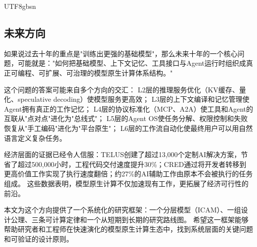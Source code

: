 \documentclass[11pt,a4paper]{article}
\begin{document}
\begin{CJK*}{UTF8}{gbsn}
\subsection{未来方向}

如果说过去十年的重点是"训练出更强的基础模型"，那么未来十年的一个核心问题，可能就是："如何把基础模型、上下文记忆、工具接口与Agent运行时组织成真正可编程、可扩展、可治理的模型原生计算体系结构。"

这个问题的答案可能来自多个方向的交汇：
L2层的推理服务优化（KV缓存、量化、speculative decoding）使模型服务更高效；
L3层的上下文编译和记忆管理使Agent拥有真正的工作记忆；
L4层的协议标准化（MCP、A2A）使工具和Agent的互联从"点对点"进化为"总线式"；
L5层的Agent OS使任务分解、权限控制和失败恢复从"手工编码"进化为"平台原生"；
L6层的工作流自动化使最终用户可以用自然语言定义复杂任务。

经济层面的证据已经令人信服：TELUS创建了超过13{,}000个定制AI解决方案，节省了超过500{,}000小时，工程代码交付速度提升30\%；CRED通过将开发者转移到更高价值工作实现了执行速度翻倍；约27\%的AI辅助工作由原本不会被执行的任务组成\cite{anthropic2026agenticreport}。
这些数据表明，模型原生计算不仅加速现有工作，更拓展了经济可行性的前沿。

本文为这个方向提供了一个系统化的研究框架：一个分层模型（ICAM）、一组设计公理、三条可计算定律和一个从短期到长期的研究路线图。
希望这一框架能够帮助研究者和工程师在快速演化的模型原生计算生态中，找到系统层面的关键问题和可验证的设计原则。




\end{CJK*}
\end{document}

